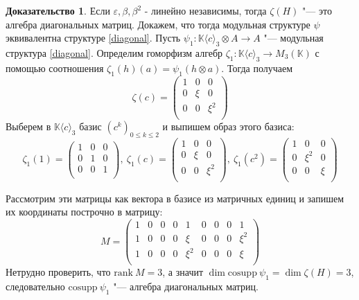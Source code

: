 \documentclass[a4paper, 12pt]{article}
\theoremstyle{definition}
\newtheorem*{prof}{\hspace*{\parindent}Доказательство}
\begin{document}
\begin{prof}
    Если $\varepsilon, \beta, \beta^2$ - линейно независимы, тогда $\zeta(H)$ "--- это алгебра диагональных матриц. 
    Докажем, что тогда модульная структуре $\psi$ эквивалентна структуре \ref{diagonal}.
    Пусть $\psi_1: \mathbb{K}\langle c\rangle_3 \otimes A \to A$ "--- модульная структура \ref{diagonal}.
    Определим гоморфизм алгебр $\zeta_1:\mathbb{K}\langle c\rangle_3 \to M_3(\mathbb{K})$ с помощью соотношения ${\zeta_1(h)(a)=\psi_1(h \otimes a)}$. Тогда получаем \[
    \zeta(c) = \begin{pmatrix}
        1 & 0 & 0\\
        0 & \xi & 0\\
        0 & 0 & \xi^2\\
    \end{pmatrix}
    \]
    Выберем в $\mathbb{K}\langle c\rangle_3$  базис $(c^k)_{0 \leq k \leq 2}$ и выпишем образ этого базиса:
    \[
    \zeta_1(1) = \begin{pmatrix}
        1 & 0 & 0\\
        0 & 1 & 0\\
        0 & 0 & 1\\
    \end{pmatrix},\
    \zeta_1(c) = \begin{pmatrix}
        1 & 0 & 0\\
        0 & \xi & 0\\
        0 & 0 & \xi^2\\
    \end{pmatrix},\ 
    \zeta_1(c^2) = \begin{pmatrix}
        1 & 0 & 0\\
        0 & \xi^2 & 0\\
        0 & 0 & \xi\\
    \end{pmatrix}
    \]

    Рассмотрим эти матрицы как вектора в базисе из матричных единиц и запишем их координаты построчно в матрицу: \[
        M = \begin{pmatrix}
            1 & 0 & 0 & 0 & 1 & 0 & 0 & 0 & 1\\
            1 & 0 & 0 & 0 & \xi & 0 & 0 & 0 & \xi^2\\
            1 & 0 & 0 & 0 & \xi^2 & 0 & 0 & 0 & \xi\\
        \end{pmatrix}
    \]
    Нетрудно проверить, что $\mathrm{rank}\ M = 3$, а значит $\dim \mathrm{cosupp}\ \psi_1 = \dim \zeta(H) = 3$, следовательно $\mathrm{cosupp}\ \psi_1$ "--- алгебра диагональных матриц.


\end{prof}
\end{document}

